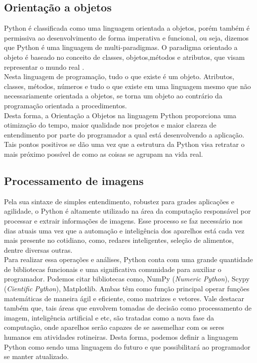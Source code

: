         \subsection{ Orienta\c{c}\~{a}o a objetos}
\begin{figure}[H]
\begin{center}
 \label{ling2}
\end{center}
\end{figure}
Python é classificada como uma linguagem orientada a objetos, porém também é permissiva ao desenvolvimento de forma imperativa e funcional, ou seja, dizemos que Python é uma linguagem de multi-paradigmas. O paradigma orientado a objeto é baseado no conceito de classes, objetos,métodos e atributos, que visam representar o mundo real \cite{FBarelli2019}. \\
Nesta linguagem de programação, tudo o que existe é um objeto. Atributos, classes, métodos, números e tudo o que existe em uma linguagem mesmo que não necessariamente orientada a objetos, se torna um objeto ao contrário da programação orientada a procedimentos.\\
Desta forma, a Orientação a Objetos na linguagem Python proporciona uma otimização do tempo, maior qualidade nos projetos e maior clareza de entendimento por parte do programador a qual está desenvolvendo a aplicação. Tais pontos positivos se dão uma vez que a estrutura da Python visa retratar o mais próximo possível de como as coisas se agrupam na vida real.  

        \subsection{Processamento de imagens} 
Pela sua sintaxe de simples entendimento, robustez para grades aplicações e agilidade, o Python é altamente utilizado na área da computação responsável por processar e extrair informações de imagens. Esse processo se faz necessário nos dias atuais uma vez que a automação e inteligência dos aparelhos está cada vez mais presente no cotidiano, como, redares inteligentes, seleção de alimentos, dentre diversas outras.\\
Para realizar essa operações e análises, Python conta com uma grande quantidade de bibliotecas funcionais e uma significativa comunidade para auxiliar o programador. Podemos citar bibliotecas como, NumPy (\textit{Numeric Python}), Scypy (\textit{Cientific Python}), Matplotlib. Ambas têm como função principal operar funções matemáticas de maneira ágil e eficiente, como matrizes e vetores.
Vale destacar também que, tais áreas que envolvem tomadas de decisão como processamento de imagem, inteligência artificial e etc, são tratadas como a nova fase da computação, onde aparelhos serão capazes de se assemelhar com os seres humanos em atividades rotineiras. Desta forma, podemos definir a linguagem Python como sendo uma linguagem do futuro e que possibilitará ao programador se manter atualizado\cite{FBarelli2019}. 
